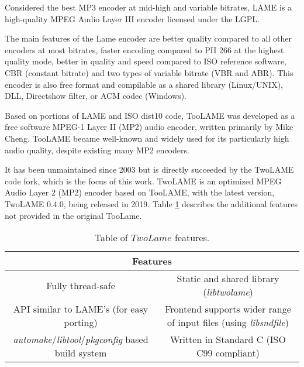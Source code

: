 Considered the best MP3 encoder at mid-high and variable bitrates, LAME \cite{lame} is a high-quality MPEG Audio Layer III encoder licensed under the LGPL.

The main features of the Lame encoder are better quality compared to all other encoders at most bitrates, faster encoding compared to PII 266 at the highest quality mode, better in quality and speed compared to ISO reference software, CBR (constant bitrate) and two types of variable bitrate (VBR and ABR). This encoder is also free format and compilable as a shared library (Linux/UNIX), DLL, Directshow filter, or ACM codec (Windows).

Based on portions of LAME and ISO dist10 code, TooLAME \cite{toolame} was developed as a free software MPEG-1 Layer II (MP2) audio encoder, written primarily by Mike Cheng.
TooLAME became well-known and widely used for its particularly high audio quality, despite existing many MP2 encoders.

It has been unmaintained since 2003 but is directly succeeded by the TwoLAME \cite{twolame} code fork, which is the focus of this work.
TwoLAME is an optimized MPEG Audio Layer 2 (MP2) encoder based on TooLAME, with the latest version, TwoLAME 0.4.0, being released in 2019.
Table \ref{tab:twolame} describes the additional features not provided in the original TooLame.

\begin{table}[h]
    \centering
    \begin{tabular}{|c|c|}
        \hline
        \multicolumn{2}{|c|}{\textbf{Features}} \\
        \hline
         Fully thread-safe & Static and shared library (\textit{libtwolame}) \\
         \hline
         API similar to LAME's (for easy porting) & Frontend supports wider range of input files (using \textit{libsndfile}) \\
         \hline
         \textit{automake}/\textit{libtool}/\textit{pkgconfig} based build system & Written in Standard C (ISO C99 compliant)\\
         \hline
    \end{tabular}
    \caption{Table of $TwoLame$ features.}
    \label{tab:twolame}
\end{table}
